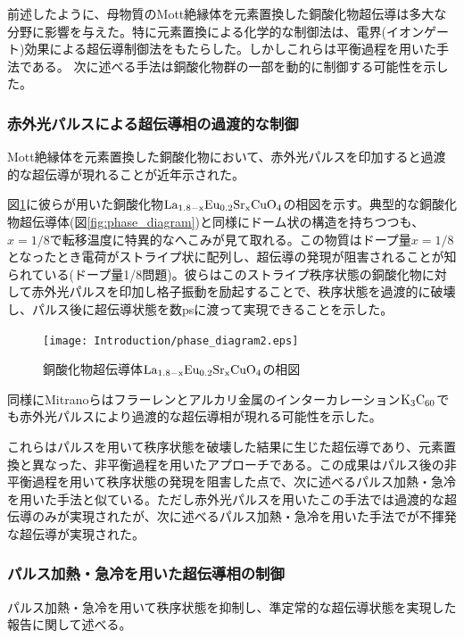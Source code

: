 前述したように、母物質のMott絶縁体を元素置換した銅酸化物超伝導は多大な分野に影響を与えた。特に元素置換による化学的な制御法は、電界(イオンゲート)効果による超伝導制御法をもたらした。しかしこれらは平衡過程を用いた手法である。
次に述べる手法は銅酸化物群の一部を動的に制御する可能性を示した。

\subsubsection{赤外光パルスによる超伝導相の過渡的な制御}
Mott絶縁体を元素置換した銅酸化物において、赤外光パルスを印加すると過渡的な超伝導が現れることが近年示された\cite{Fausti,Hunt2015}。

図\ref{fig:phase_diagram2}に彼らが用いた銅酸化物$\rm La_{1.8-x}Eu_{0.2}Sr_{x}CuO_4$の相図を示す\cite{Cavalleri2018}。典型的な銅酸化物超伝導体(図\ref{fig:phase_diagram})と同様にドーム状の構造を持ちつつも、$x=1/8$で転移温度に特異的なへこみが見て取れる。この物質はドープ量$x=1/8$となったとき電荷がストライプ状に配列し、超伝導の発現が阻害されることが知られている(ドープ量1/8問題)。彼らはこのストライプ秩序状態の銅酸化物に対して赤外光パルスを印加し格子振動を励起することで、秩序状態を過渡的に破壊し、パルス後に超伝導状態を数psに渡って実現できることを示した。
\begin{figure}[!h]
    \begin{center}
   \texttt{[image: Introduction/phase\_diagram2.eps]}
  \end{center}
  \caption{銅酸化物超伝導体$\rm La_{1.8-x}Eu_{0.2}Sr_{x}CuO_4$の相図\cite{Cavalleri2018}}
  \label{fig:phase_diagram2}
\end{figure}


同様にMitranoらはフラーレンとアルカリ金属のインターカレーション$\rm K_3C_{60}$でも赤外光パルスにより過渡的な超伝導相が現れる可能性を示した\cite{Mitrano2016}。

これらはパルスを用いて秩序状態を破壊した結果に生じた超伝導であり、元素置換と異なった、非平衡過程を用いたアプローチである。この成果はパルス後の非平衡過程を用いて秩序状態の発現を阻害した点で、次に述べるパルス加熱・急冷を用いた手法と似ている。ただし赤外光パルスを用いたこの手法では過渡的な超伝導のみが実現されたが、次に述べるパルス加熱・急冷を用いた手法でが不揮発な超伝導が実現された。

\subsubsection{パルス加熱・急冷を用いた超伝導相の制御}
パルス加熱・急冷を用いて秩序状態を抑制し、準定常的な超伝導状態を実現した報告に関して述べる。


